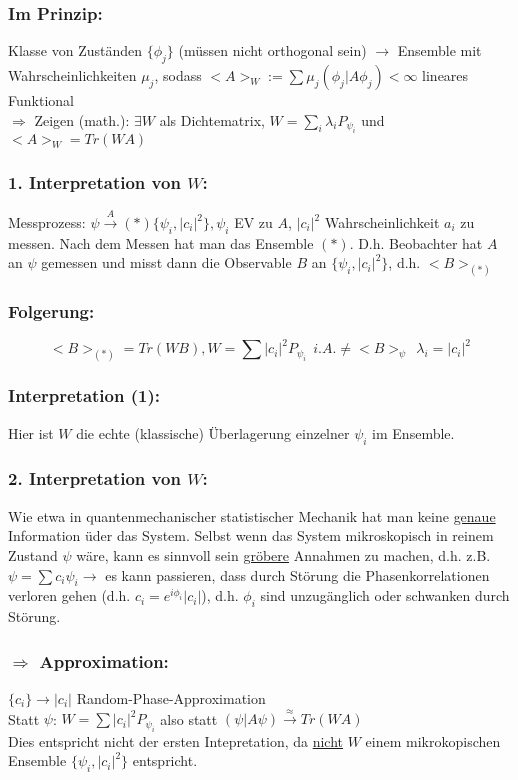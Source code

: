 \documentclass[twoside,a4paper]{scrartcl}
\renewcommand{\1}{\mathds{1}}
\newcommand{\Ra}{\Rightarrow}
\newcommand{\ra}{\rightarrow}
\renewcommand{\l}{\lambda}
\begin{document}
\subsubsection*{Im Prinzip:}
Klasse von Zuständen $\{\phi_j\}$ (müssen nicht orthogonal sein) $\ra$ Ensemble mit Wahrscheinlichkeiten $\mu_j$, sodass $<A>_W:= \sum \mu_j (\phi_j|A\phi_j)<\infty$ lineares Funktional\\
$\Ra$ Zeigen (math.): $\exists W$ als Dichtematrix, $W=\sum_i \l_i P_{\psi_i}$ und $<A>_W=Tr(WA)$
\subsubsection*{1. Interpretation von $W$:}
Messprozess: $\psi \stackrel{A}{\ra} (*)\{\psi_i,|c_i|^2\}, \psi_i$ EV zu $A$, $|c_i|^2$ Wahrscheinlichkeit $a_i$ zu messen. Nach dem Messen hat man das Ensemble $(*)$. D.h. Beobachter hat $A$ an $\psi$ gemessen und misst dann die Observable $B$ an $\{\psi_i,|c_i|^2\}$, d.h. $<B>_{(*)}$
\subsubsection*{Folgerung:}
$$<B>_{(*)}=Tr(WB), W=\sum |c_i|^2 P_{\psi_i} \ \  i.A. \neq <B>_\psi  \ \ \l_i=|c_i|^2$$
\subsubsection*{Interpretation (1):}
Hier ist $W$ die echte (klassische) Überlagerung einzelner $\psi_i$ im Ensemble.
\subsubsection*{2. Interpretation von $W$:}
Wie etwa in quantenmechanischer statistischer Mechanik hat man keine \underline{genaue} Information üder das System. Selbst wenn das System mikroskopisch in reinem Zustand $\psi$ wäre, kann es sinnvoll sein \underline{gröbere} Annahmen zu machen, d.h. z.B. $\psi=\sum c_i \psi_i \ra$ es kann passieren, dass durch Störung die Phasenkorrelationen verloren gehen (d.h. $c_i=e^{i\phi_i}|c_i|$), d.h. $\phi_i$ sind unzugänglich oder schwanken durch Störung.
\subsubsection*{$\Ra$ Approximation:}
$\{c_i \} \ra |c_i|$ Random-Phase-Approximation\\
Statt $\psi$: $W=\sum |c_i|^2 P_{\psi_i}$ also statt $(\psi|A\psi) \stackrel{\approx}{\ra} Tr(WA)$\\
Dies entspricht nicht der ersten Intepretation, da \underline{nicht} $W$ einem mikrokopischen Ensemble $\{\psi_i, |c_i|^2\}$ entspricht.\\
\end{document}
